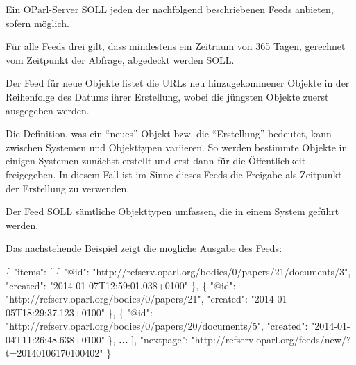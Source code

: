 \documentclass[,a4paper]{article}
\newenvironment{Shaded}{}{}
\newcommand{\DataTypeTok}[1]{\textcolor[rgb]{0.56,0.13,0.00}{{#1}}}
\newcommand{\StringTok}[1]{\textcolor[rgb]{0.25,0.44,0.63}{{#1}}}
\newcommand{\ErrorTok}[1]{\textcolor[rgb]{1.00,0.00,0.00}{\textbf{{#1}}}}
\newcommand{\NormalTok}[1]{{#1}}
\begin{document}
Ein OParl-Server SOLL jeden der nachfolgend beschriebenen Feeds
anbieten, sofern möglich.

Für alle Feeds drei gilt, dass mindestens ein Zeitraum von 365 Tagen,
gerechnet vom Zeitpunkt der Abfrage, abgedeckt werden SOLL.


Der Feed für neue Objekte listet die URLs neu hinzugekommener Objekte in
der Reihenfolge des Datums ihrer Erstellung, wobei die jüngsten Objekte
zuerst ausgegeben werden.

Die Definition, was ein ``neues'' Objekt bzw. die ``Erstellung''
bedeutet, kann zwischen Systemen und Objekttypen variieren. So werden
bestimmte Objekte in einigen Systemen zunächst erstellt und erst dann
für die Öffentlichkeit freigegeben. In diesem Fall ist im Sinne dieses
Feeds die Freigabe als Zeitpunkt der Erstellung zu verwenden.

Der Feed SOLL sämtliche Objekttypen umfassen, die in einem System
geführt werden.

Das nachstehende Beispiel zeigt die mögliche Ausgabe des Feeds:

\begin{Shaded}
\begin{Highlighting}[]
\NormalTok{\{}
    \DataTypeTok{"items"}\NormalTok{: [}
        \NormalTok{\{}
            \DataTypeTok{"@id"}\NormalTok{: }\StringTok{"http://refserv.oparl.org/bodies/0/papers/21/documents/3"}\NormalTok{,}
            \DataTypeTok{"created"}\NormalTok{: }\StringTok{"2014-01-07T12:59:01.038+0100"}
        \NormalTok{\},}
        \NormalTok{\{}
            \DataTypeTok{"@id"}\NormalTok{: }\StringTok{"http://refserv.oparl.org/bodies/0/papers/21"}\NormalTok{,}
            \DataTypeTok{"created"}\NormalTok{: }\StringTok{"2014-01-05T18:29:37.123+0100"}
        \NormalTok{\},}
        \NormalTok{\{}
            \DataTypeTok{"@id"}\NormalTok{: }\StringTok{"http://refserv.oparl.org/bodies/0/papers/20/documents/5"}\NormalTok{,}
            \DataTypeTok{"created"}\NormalTok{: }\StringTok{"2014-01-04T11:26:48.638+0100"}
        \NormalTok{\},}
        \ErrorTok{...}
    \NormalTok{],}
    \DataTypeTok{"nextpage"}\NormalTok{: }\StringTok{"http://refserv.oparl.org/feeds/new/?t=20140106170100402"}
\NormalTok{\}}
\end{Highlighting}
\end{Shaded}
\end{document}

